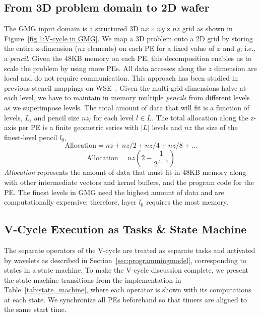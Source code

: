 \documentclass[sigconf]{acmart}
\begin{document}
\subsection{From 3D problem domain to 2D wafer} \label{sec:data_layout}
        The GMG input domain is a structured 3D \(nx \times ny \times nz\) grid as shown in Figure~\ref{fig 1:V-cycle in GMG}. We map a 3D problem onto a 2D grid by storing the entire z-dimension ($nz$ elements) on each PE for a fixed value of $x$ and $y$; i.e., a \textit{pencil}. Given the 48KB memory on each PE, this decomposition enables us to scale the problem by using more PEs. All data accesses along the $z$ dimension are local and do not require communication. This approach has been studied in previous stencil mappings on WSE~\cite{Rocki,Sai,sai2,mathias}. Given the multi-grid dimensions halve at each level, we have to maintain in memory multiple \textit{pencils} from different levels as we superimpose levels. The total amount of data that will fit is a function of levels, $L$, and pencil size $nz_l$ for each level $l \in L$. The total allocation %
        along the z-axis per PE is a finite geometric series with $|L|$ levels and $nz$ the size of the finest-level pencil $l_0$,
        \vspace{5pt}
        \[
        \text{Allocation} = nz + nz/2  + nz/4  + nz/8 + ...
        \]
        \[
        \text{Allocation} = nz \left( 2 - \frac{1}{2^{\,l-1}} \right)
        \]
        \textit{Allocation} represents the amount of data that must fit in 48KB memory along with other intermediate vectors and kernel buffers, and the program code for the PE.
        The finest levels in GMG need the highest amount of data and are computationally expensive; therefore, layer $l_0$ requires the most memory. 

    \subsection{V-Cycle Execution as Tasks \& State Machine}
    \label{sec:statemachine}
    The separate operators of the V-cycle are treated as separate tasks and activated by wavelets as described in Section~\ref{sec:programmingmodel}, corresponding to states in a state machine.   
    To make the V-cycle discussion complete, we present the state machine transitions from the implementation in Table~\ref{tab:state_machine}, where each operator is shown with its computations at each state.
    We synchronize all PEs beforehand so that timers are aligned to the same start time. 
    
\end{document}
